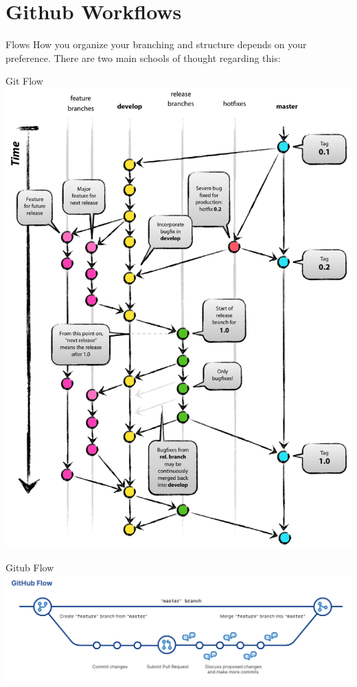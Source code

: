 \section{Github Workflows}

\begin{frame}{Flows}
    How you organize your branching and structure depends on your preference. There are two main schools of thought regarding this:
\end{frame}

\begin{frame}{Git Flow}
    \centering \includegraphics[height=0.8\textheight]{eimg/git-model@2x.png}
\end{frame}

\begin{frame}{Gitub Flow}
    \centering \includegraphics[width=\textwidth]{eimg/Screenshot_20230902_164537.png}
\end{frame}

